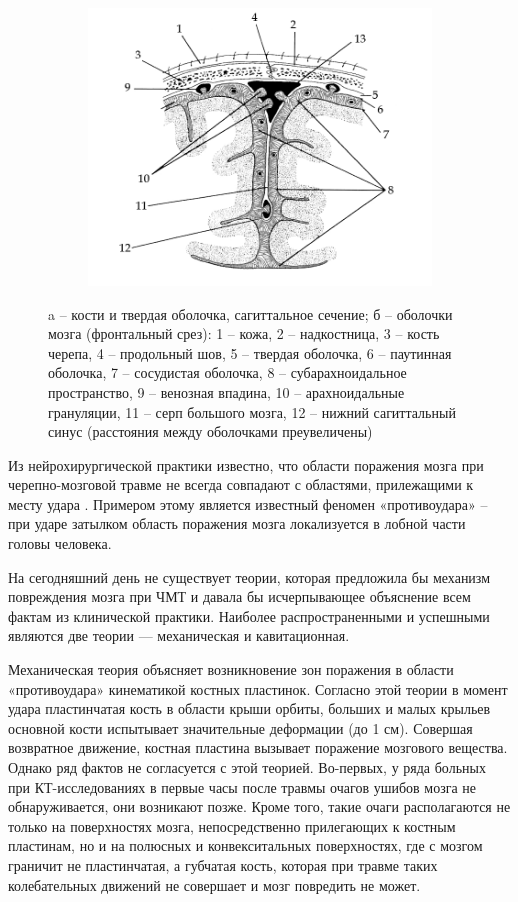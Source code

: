 \begin{figure}[htp]
\begin{subfigure}[b]{0.6\textwidth}
\includegraphics[width=\textwidth]{png/cranium/real-scheme-02.png}
\end{subfigure}
\caption{a – кости и твердая оболочка, сагиттальное сечение; б – оболочки мозга (фронтальный срез): 1 – кожа, 2 – надкостница, 3 – кость черепа, 4 – продольный шов, 5 – твердая оболочка, 6 – паутинная оболочка, 7 – сосудистая оболочка, 8 – субарахноидальное пространство, 9 – венозная впадина, 10 – арахноидальные грануляции, 11 – серп большого мозга, 12 – нижний сагиттальный синус (расстояния между оболочками преувеличены)}
\label{pic:cranium_scheme}
\end{figure}

Из нейрохирургической практики известно, что области поражения мозга при черепно-мозговой травме не всегда совпадают с областями, прилежащими к месту удара \cite{agapov_belocerkovsky_petrov}. Примером этому является известный феномен «противоудара» – при ударе затылком область поражения мозга локализуется в лобной части головы человека.

На сегодняшний день не существует теории, которая предложила бы механизм повреждения мозга при ЧМТ и давала бы исчерпывающее объяснение всем фактам из клинической практики. Наиболее распространенными и успешными являются две теории — механическая и кавитационная.

Механическая теория объясняет возникновение зон поражения в области «противоудара» кинематикой костных пластинок. Согласно этой теории в момент удара пластинчатая кость в области крыши орбиты, больших и малых крыльев основной кости испытывает значительные деформации (до 1 см). Совершая возвратное движение, костная пластина вызывает поражение мозгового вещества. Однако ряд фактов не согласуется с этой теорией. Во-первых, у ряда больных при КТ-исследованиях в первые часы после травмы очагов ушибов мозга не обнаруживается, они возникают позже. Кроме того, такие очаги располагаются не только на поверхностях мозга, непосредственно прилегающих к костным пластинам, но и на полюсных и конвекситальных поверхностях, где с мозгом граничит не пластинчатая, а губчатая кость, которая при травме таких колебательных движений не совершает и мозг повредить не может.

